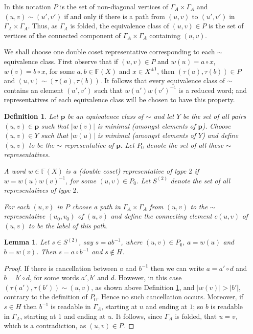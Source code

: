 \documentclass[a4paper,12pt]{article}
\newcommand{\G}{\Gamma }
\renewcommand{\t}{\tau }
\newcommand{\pp}{\mathbf{p}}
\newtheorem{lemma}[theorem]{Lemma}
\newtheorem{definition}[theorem]{Definition}
\numberwithin{equation}{section}
\numberwithin{figure}{section}
\newcommand{\FF}{\ensuremath{\mathbb{F}}}
\begin{document}
In this notation $P$ is the set of non-diagonal vertices of
$\G_A\times \G_A$ and $(u,v)\sim (u',v')$ if and only if there is
a path from $(u,v)$ to $(u',v')$ in $\G_A\times \G_A$.
 Thus, as $\G_A$ is folded, the equivalence class of $(u,v)\in P$
is the set of vertices of the connected component of $\G_A\times \G_A$
containing $(u,v)$.

We shall choose one double coset representative corresponding to
each $\sim$ equivalence class. First observe that if
$(u,v)\in P$ and $w(u)=a\circ x$, $w(v)=b\circ x$, for some
$a,b\in \FF(X)$ and $x\in X^{\pm 1}$, then $(\t(a),\t(b))\in P$ and
$(u,v)\sim (\t(a),\t(b))$. It follows that every equivalence  class
of $\sim$ contains an element $(u',v')$ such that
$w(u')w(v')^{-1}$ is a reduced word; and representatives of each
equivalence class will be chosen to have this property.

\begin{definition}\label{def:repres_t2}
Let $\pp$ be an equivalence class of $\sim$ and let $Y$ be the set
of all pairs $(u,v)\in \pp$ such that $|w(v)|$ is minimal (amongst
elements of $\pp$). Choose $(u,v)\in Y$ such that $|w(u)|$ is
minimal (amongst elements of $Y$) and define $(u,v)$ to be the
$\sim$ {\em representative} of
$\pp$. %
Let $P_0$ denote the set of  all these $\sim$
representatives.

A word $w\in \FF(X)$ is
 a {\em (double coset) representative of type} $2$
if $w=w(u)w(v)^{-1}$, for some $(u,v)\in P_0$.
Let $S^{(2)}$ denote the set of all representatives of type $2$.

For each $(u,v)$ in $P$ choose a path in $\G_A\times \G_A$
from $(u,v)$ to the $\sim$ representative
$(u_0,v_0)$ of $(u,v)$ and define the {\em connecting element}
$c(u,v)$  of $(u,v)$ to be the label of this path.
\end{definition}

\begin{lemma}\label{lem:rep2}
Let $s\in S^{(2)}$, say $s=ab^{-1}$, where $(u,v)\in P_0$, 
$a=w(u)$ and $b=w(v)$. Then
$s=a\circ b^{-1}$ and $s\notin H$.
\end{lemma}
\begin{proof}
If there is cancellation between $a$ and $b^{-1}$ then we can
 write $a=a'\circ d$ and $b=b'\circ d$, for some words $a',b'$ and $d$. 
However, in this case $(\t(a'),\t(b'))\sim (u,v)$, as shown above
Definition \ref{def:repres_t2}, and $|w(v)|>|b'|$, contrary to the
definition of $P_0$. Hence no such cancellation occurs. Moreover, 
if $s\in H$ then $b^{-1}$ is readable in $\G_A$, starting at $u$ 
and ending at $1$; so
$b$ is readable in $\G_A$, starting at $1$ and ending at $u$. It
follows, since $\G_A$ is folded, that $u=v$, which is a contradiction, 
as $(u,v)\in P$.  
\end{proof}
\end{document}
